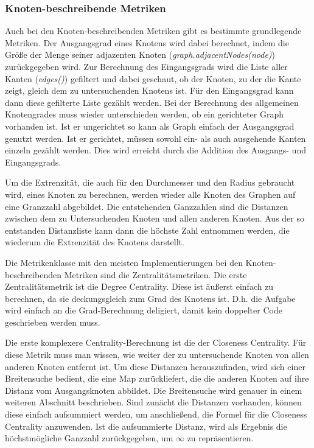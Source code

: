 \documentclass[a4paper,12pt,ngerman,chapterprefix=false,listof=totoc,bibliography=totoc]{scrreprt}
\begin{document}
{{\subsubsection*{Knoten-beschreibende Metriken}
{
Auch bei den Knoten-beschreibenden Metriken gibt es bestimmte grundlegende Metriken. Der Ausgangsgrad eines Knotens wird dabei berechnet, indem die Größe der Menge seiner adjazenten Knoten (\textit{graph.adjacentNodes(node)}) zurückgegeben wird. Zur Berechnung des Eingangsgrads wird die Liste aller Kanten (\textit{edges()}) gefiltert und dabei geschaut, ob der Knoten, zu der die Kante zeigt, gleich dem zu untersuchenden Knotens ist. Für den Eingangsgrad kann dann diese gefilterte Liste gezählt werden. Bei der Berechnung des allgemeinen Knotengrades muss wieder unterschieden werden, ob ein gerichteter Graph vorhanden ist. Ist er ungerichtet so kann als Graph einfach der Ausgangsgrad genutzt werden. Ist er gerichtet, müssen sowohl ein- als auch ausgehende Kanten einzeln gezählt werden. Dies wird erreicht durch die Addition des Ausgangs- und Eingangsgrads.

Um die Extrenzität, die auch für den Durchmesser und den Radius gebraucht wird, eines Knoten zu berechnen, werden wieder alle Knoten des Graphen auf eine Granzzahl abgebildet. Die entstehenden Ganzzahlen sind die Distanzen zwischen dem zu Untersuchenden Knoten und allen anderen Knoten. Aus der so entstanden Distanzliste kann dann die höchste Zahl entnommen werden, die wiederum die Extrenzität des Knotens darstellt.

Die Metrikenklasse mit den meisten Implementierungen bei den Knoten-beschreibenden Metriken sind die Zentralitätsmetriken. Die erste Zentralitätsmetrik ist die Degree Centrality. Diese ist äußerst einfach zu berechnen, da sie deckungsgleich zum Grad des Knotens ist. D.h. die Aufgabe wird einfach an die Grad-Berechnung deligiert, damit kein doppelter Code geschrieben werden muss.

Die erste komplexere Centrality-Berechnung ist die der Closeness Centrality. Für diese Metrik muss man wissen, wie weiter der zu untersuchende Knoten von allen anderen Knoten entfernt ist. Um diese Distanzen herauszufinden, wird sich einer Breitensuche bedient, die eine Map zurückliefert, die die anderen Knoten auf ihre Distanz vom Ausgangsknoten abbildet. Die Breitensuche wird genauer in einem weiteren Abschnitt beschrieben. Sind zunächt die Distanzen vorhanden, können diese einfach aufsummiert werden, um anschließend, die Formel für die Closeness Centrality anzuwenden. Ist die aufsummierte Distanz, wird als Ergebnis die höchstmögliche Ganzzahl zurückgegeben, um \(\infty\) zu repräsentieren.

}}}
\end{document}
